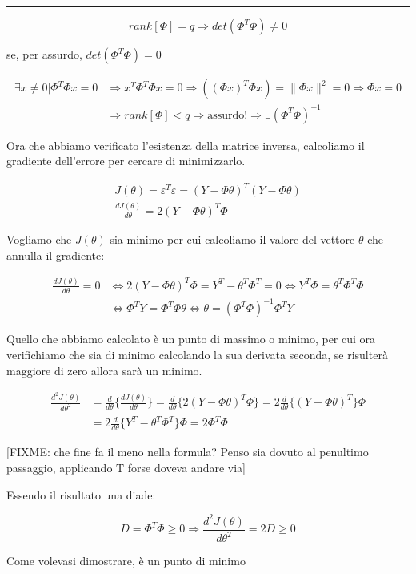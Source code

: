 \begin{center} \rule{300pt}{1pt} \end{center}
\begin{dimostrazione}

  \[ rank[\Phi]=q \Longrightarrow det(\Phi^T\Phi) \ne 0 \]
  
se, per assurdo, $det(\Phi^T\Phi)=0$

  \[ 
    \begin{split}
      \exists x \ne 0 | \Phi^T\Phi x=0 &\Longrightarrow x^T\Phi^T\Phi x=0 \Longrightarrow ((\Phi x)^T\Phi x)=\| \Phi x \|^2 =0 \Longrightarrow \Phi x =0\\
       &\Longrightarrow rank[\Phi]<q \Longrightarrow \text{assurdo!} \Longrightarrow \exists (\Phi^T\Phi)^{-1} 
    \end{split} 
  \]
  
Ora che abbiamo verificato l'esistenza della matrice inversa, calcoliamo il gradiente dell'errore per cercare di minimizzarlo.

  \begin{gather*}
    J(\theta)=\varepsilon^T\varepsilon=(Y-\Phi\theta)^T(Y-\Phi\theta)\\
    \frac{dJ(\theta)}{d\theta}=2(Y-\Phi\theta)^T\Phi
  \end{gather*}
  
Vogliamo che $J(\theta)$ sia minimo per cui calcoliamo il valore del vettore $\theta$ che annulla il gradiente:

  \[ 
    \begin{split}\frac{dJ(\theta)}{d\theta} = 0 &\Leftrightarrow  2(Y-\Phi\theta)^T\Phi=Y^T-\theta^T\Phi^T=0 \Leftrightarrow Y^T\Phi=\theta^T\Phi^T\Phi \\ &\Leftrightarrow \Phi^TY=\Phi^T\Phi\theta \Leftrightarrow \theta= (\Phi^T\Phi)^{-1}\Phi^TY 
    \end{split}
  \]
  
Quello che abbiamo calcolato è un punto di massimo o minimo, per cui ora verifichiamo che sia di minimo calcolando la sua derivata seconda, se risulterà maggiore di zero allora sarà un minimo.

  \[ 
    \begin{split} \frac{d^2J(\theta)}{d\theta^2}&=\frac{d}{d\theta}\{\frac{dJ(\theta)}{d\theta}\}= \frac{d}{d\theta}\{2(Y-\Phi\theta)^T\Phi\}=2\frac{d}{d\theta}\{(Y-\Phi\theta)^T\}\Phi\\
  &=2\frac{d}{d\theta}\{Y^T-\theta^T\Phi^T\}\Phi=2\Phi^T\Phi 
    \end{split} 
  \] 
  
\begin{center}[FIXME: che fine fa il meno nella formula? Penso sia dovuto al penultimo passaggio, applicando T forse doveva andare via]\end{center}

Essendo il risultato una diade:

  \[ D=\Phi^T\Phi \geq 0 \Longrightarrow \frac{d^2J(\theta)}{d\theta^2}=2D \geq 0 \]
  
Come volevasi dimostrare, è un punto di minimo
\end{dimostrazione}
